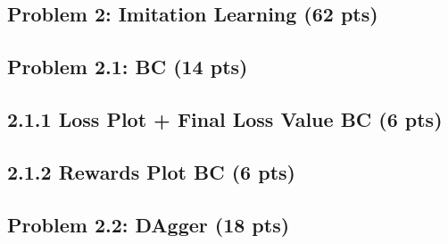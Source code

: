 \documentclass[12pt]{article}
\begin{document}
\newpage

\subsection*{Problem 2: Imitation Learning (62 pts)}
\subsection*{Problem 2.1: BC (14 pts)}

\subsection*{2.1.1 Loss Plot + Final Loss Value BC (6 pts)}
\begin{tcolorbox}[fit,height=20em, width=40em, blank, borderline={1pt}{1pt},nobeforeafter]
            \begin{solution}                  

                                    \end{solution}
            \end{tcolorbox}

\subsection*{2.1.2 Rewards Plot BC (6 pts)}

\begin{tcolorbox}[fit,height=24em, width=40em, blank, borderline={1pt}{1pt},nobeforeafter]
            \begin{solution}

                                \end{solution}

\end{tcolorbox}



\subsection*{Problem 2.2: DAgger (18 pts)}
\end{document}

